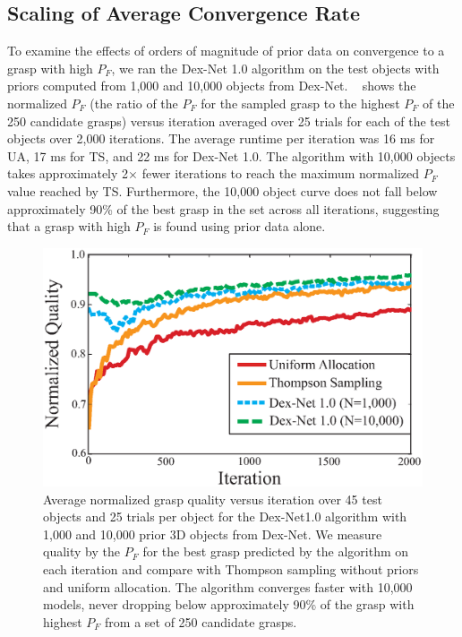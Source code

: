 \subsection{Scaling of Average Convergence Rate}
To examine the effects of orders of magnitude of prior data on convergence to a grasp with high $P_F$, we ran the Dex-Net 1.0 algorithm on the test objects with priors computed from 1,000 and 10,000 objects from Dex-Net. 
~ shows the normalized $P_F$  (the ratio of the $P_F$ for the sampled grasp to the highest $P_F$ of the 250 candidate grasps) versus iteration averaged over 25 trials for each of the test objects over 2,000 iterations.
The average runtime per iteration was 16 ms for UA, 17 ms for TS, and 22 ms for Dex-Net 1.0.
The algorithm with 10,000 objects takes approximately 2$\times$ fewer iterations to reach the maximum normalized $P_F$ value reached by TS.
Furthermore, the 10,000 object curve does not fall below approximately 90\% of the best grasp in the set across all iterations, suggesting that a grasp with high $P_F$ is found using prior data alone.

\begin{figure}[t!]
\centering
\includegraphics[scale=0.40]{figures/illustrations/avg_reward.eps}
\caption{Average normalized grasp quality versus iteration over 45 test objects and 25 trials per object for the Dex-Net1.0 algorithm with 1,000 and 10,000 prior 3D objects from Dex-Net. We measure quality by the $P_F$ for the best grasp predicted by the algorithm on each iteration and compare with Thompson sampling without priors and uniform allocation. The algorithm converges faster with 10,000 models, never dropping below approximately 90\% of the grasp with highest $P_F$ from a set of 250 candidate grasps.}
\vspace*{-10pt}
\end{figure}

